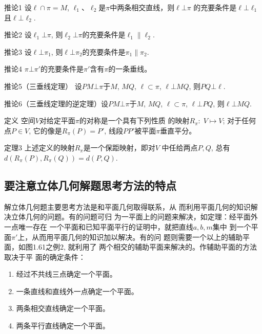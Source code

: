 \begin{blk}
{推论1} 设$\ell\cap \pi=M$, $\ell_1$、$\ell_2$是$\pi$中两条相交直线，则$\ell\bot\pi$
的充要条件是$\ell\bot \ell_1$且$\ell\bot \ell_2$.
\end{blk}

\begin{blk}
{推论2}
设$\ell_1\bot\pi$, 则$\ell_2\bot\pi$的充要条件是$\ell_1\parallel \ell_2$.
\end{blk}

\begin{blk}
{推论3}
设$\ell\bot \pi_1$, 则$\ell\bot \pi_2$的充要条件是$\pi_1\parallel \pi_2$.
\end{blk}

\begin{blk}
{推论4}
$\pi\bot \pi'$的充要条件是$\pi'$含有$\pi$的一条垂线。

\end{blk}

\begin{blk}
    {推论5（三垂线定理）}
    设$PM\bot \pi$于$M$, $MQ$, $\ell\subset \pi$, 
$\ell\bot MQ$, 则$PQ\bot \ell$.
\end{blk}

\begin{blk}
{推论6（三垂线定理的逆定理）}设$PM\bot \pi$于$M$, $MQ$, 
$\ell\subset \pi$, $\ell\bot PQ$, 则$\ell\bot MQ$.
\end{blk}

\begin{blk}
    {定义} 空间$V$对给定平面$\pi$的对称是一个具有下列性质
的映射$R_{\pi}:\; V\mapsto V$; 对于任何点$P\in V$, 它的像是$R_{\pi}(P)=P'$, 
线段$PP'$被平面$\pi$垂直平分。
\end{blk}

\begin{blk}
    {定理3} 上述定义的映射$R_{\pi}$是一个保距映射，即对$V$
中任给两点$P,Q$, 总有$d(R_{\pi}(P),R_{\pi}(Q))=d(P,Q)$.
\end{blk}

\subsection{要注意立体几何解题思考方法的特点}
解立体几何题主要思考方法是和平面几何取得联系，从
而利用平面几何的知识解决立体几何的问题。有的问题可归
为一平面上的问题来解决，如定理：经平面外一点唯一存在
一个平面和已知平面平行的证明中，就把直线$a,b,m$集中
到一个平面$\pi'$上，从而用平面几何的知识加以解决。有的问
题则需要一个以上的辅助平面，如图1.61之例2, 就利用了
两个相交的辅助平面来解决的。作辅助平面的方法取决于平
面的确定条件：
\begin{enumerate}
\item 经过不共线三点确定一个平面。
\item 一条直线和直线外一点确定一个平面。
\item 两条相交直线确定一个平面。
\item 两条平行直线确定一个平面。
\end{enumerate}

